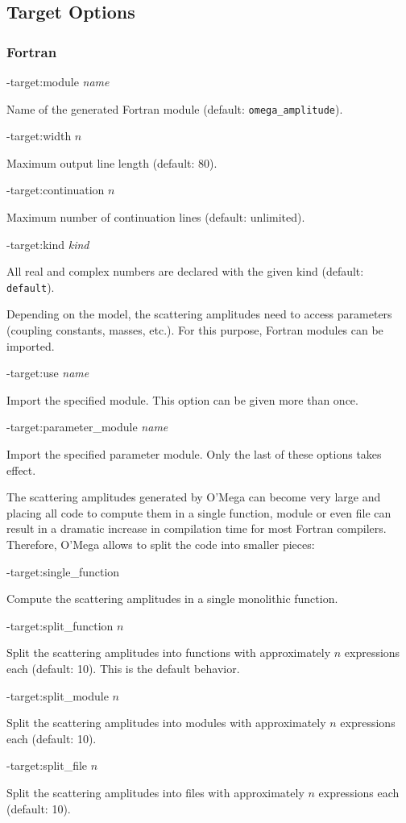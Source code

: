 \documentclass[12pt,a4paper]{article}
\newenvironment{options}%
 {\begin{list}{}%
   {\setlength{\leftmargin}{3em}%
    \setlength{\rightmargin}{3em}%
    \setlength{\itemindent}{1em}%
    \setlength{\listparindent}{0pt}%
    \settowidth{\labelwidth}{5em}%
    \renewcommand{\makelabel}[1]{\texttt{##1}}}}%
 {\end{list}}
\begin{document}
\subsection{Target Options}
\subsubsection{Fortran}
\begin{options}
  \item[-target:module] \textit{name}\par
    Name of the generated Fortran module (default: \verb+omega_amplitude+).
  \item[-target:width] $n$\par
    Maximum output line length (default: 80).
  \item[-target:continuation] $n$\par
    Maximum number of continuation lines (default: unlimited).
  \item[-target:kind] \textit{kind}\par
    All real and complex numbers are declared with the given kind
    (default: \verb+default+).
\end{options}
Depending on the model, the scattering amplitudes need to access
parameters (coupling constants, masses, etc.).  For this purpose,
Fortran modules can be imported.
\begin{options}
  \item[-target:use] \textit{name}\par
    Import the specified module.  This option can be given more than once.
  \item[-target:parameter\_module] \textit{name}\par
    Import the specified parameter module.  Only the last of these options
    takes effect.
\end{options}
The scattering amplitudes generated by O'Mega can become very large
and placing all code to compute them in a single function, module or
even file can result in a dramatic increase in compilation time for
most Fortran compilers.  Therefore, O'Mega allows to split the code
into smaller pieces:
\begin{options}
  \item[-target:single\_function]\hfil\par
    Compute the scattering amplitudes in a single monolithic
    function.
  \item[-target:split\_function] $n$\par
    Split the scattering amplitudes into functions with
    approximately $n$ expressions each (default: 10).  This is the
    default behavior.
  \item[-target:split\_module] $n$\par
    Split the scattering amplitudes into modules with
    approximately $n$ expressions each (default: 10).
  \item[-target:split\_file] $n$\par
    Split the scattering amplitudes into files with
    approximately $n$ expressions each (default: 10).
\end{options}
\end{document}
